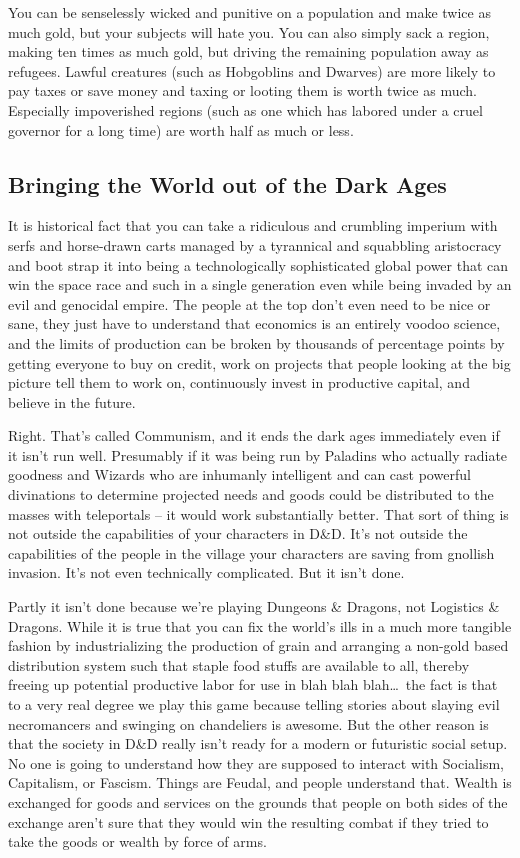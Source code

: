 You can be senselessly wicked and punitive on a population and make twice as much gold, but your subjects will hate you. You can also simply sack a region, making ten times as much gold, but driving the remaining population away as refugees. Lawful creatures (such as Hobgoblins and Dwarves) are more likely to pay taxes or save money and taxing or looting them is worth twice as much. Especially impoverished regions (such as one which has labored under a cruel governor for a long time) are worth half as much or less.

\subsection{Bringing the World out of the Dark Ages}

It is historical fact that you can take a ridiculous and crumbling imperium with serfs and horse-drawn carts managed by a tyrannical and squabbling aristocracy and boot strap it into being a technologically sophisticated global power that can win the space race and such in a single generation even while being invaded by an evil and genocidal empire. The people at the top don't even need to be nice or sane, they just have to understand that economics is an entirely voodoo science, and the limits of production can be broken by thousands of percentage points by getting everyone to buy on credit, work on projects that people looking at the big picture tell them to work on, continuously invest in productive capital, and believe in the future.

Right. That's called Communism, and it ends the dark ages immediately even if it isn't run well. Presumably if it was being run by Paladins who actually radiate goodness and Wizards who are inhumanly intelligent and can cast powerful divinations to determine projected needs and goods could be distributed to the masses with teleportals -- it would work substantially better. That sort of thing is not outside the capabilities of your characters in D\&D. It's not outside the capabilities of the people in the village your characters are saving from gnollish invasion. It's not even technically complicated. But it isn't done.

Partly it isn't done because we're playing Dungeons \& Dragons, not Logistics \& Dragons. While it is true that you can fix the world's ills in a much more tangible fashion by industrializing the production of grain and arranging a non-gold based distribution system such that staple food stuffs are available to all, thereby freeing up potential productive labor for use in blah blah blah\ldots\  the fact is that to a very real degree we play this game because telling stories about slaying evil necromancers and swinging on chandeliers is awesome. But the other reason is that the society in D\&D really isn't ready for a modern or futuristic social setup. No one is going to understand how they are supposed to interact with Socialism, Capitalism, or Fascism. Things are Feudal, and people understand that. Wealth is exchanged for goods and services on the grounds that people on both sides of the exchange aren't sure that they would win the resulting combat if they tried to take the goods or wealth by force of arms.

